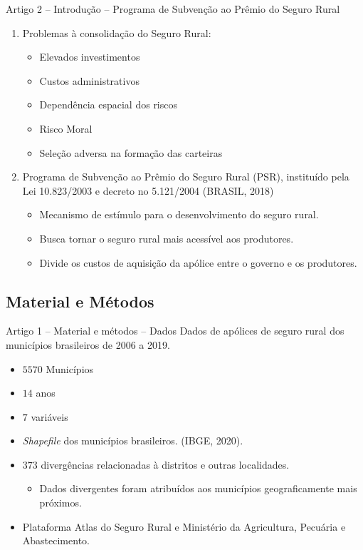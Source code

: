 \documentclass[aspectratio=169]{beamer}
\begin{document}
\begin{frame}{Artigo 2 -- Introdução -- Programa de Subvenção ao Prêmio do Seguro Rural}
    \begin{enumerate}
        \item Problemas à consolidação do Seguro Rural:
            \begin{itemize}
                \item Elevados investimentos
                \item Custos administrativos
                \item Dependência espacial dos riscos
                \item Risco Moral
                \item Seleção adversa na formação das carteiras
            \end{itemize}
        \vspace{0.25cm}
        \item Programa de Subvenção ao Prêmio do Seguro Rural (PSR), instituído pela Lei 10.823/2003 e decreto no 5.121/2004
		(BRASIL, 2018)
            \begin{itemize}
                \item Mecanismo de estímulo para o desenvolvimento do seguro rural.
                \item Busca tornar o seguro rural mais acessível aos produtores.
                \item Divide os custos de aquisição da apólice entre o governo e os produtores. 
            \end{itemize}
    \end{enumerate}
\end{frame}

\subsection{Material e Métodos}

\begin{frame}{Artigo 1 -- Material e métodos -- Dados}
	Dados de apólices de seguro rural dos municípios brasileiros de 2006 a 2019. 
	\vspace{0.5cm}
    \begin{itemize}
        \item $5570$ Municípios
        \item $14$ anos
        \item $7$ variáveis
        \item \textit{Shapefile} dos municípios brasileiros. (IBGE, 2020).
        \item $373$ divergências relacionadas à distritos e outras localidades.
        \begin{itemize}
            \item Dados divergentes foram atribuídos aos municípios geograficamente mais próximos. 
        \end{itemize}
        \item Plataforma Atlas do Seguro Rural e Ministério da Agricultura, Pecuária e Abastecimento.
    \end{itemize}
\end{frame}
\end{document}
